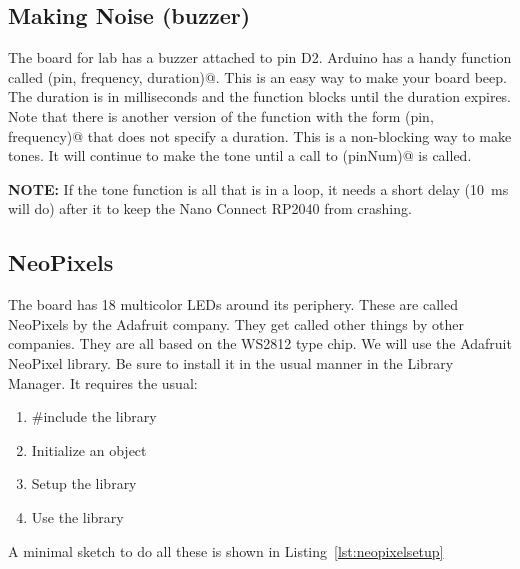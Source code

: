 \subsection{Making Noise (buzzer)}
The board for lab has a buzzer attached to pin D2. Arduino has a handy function called 
\lstinline@tone(pin, frequency, duration)@. This is an easy way to make your board beep.
The duration is in milliseconds and the function blocks until the duration expires. Note 
that there is another version of the function with the form 
\lstinline@tone(pin, frequency)@ that does not specify a duration. This is a non-blocking
way to make tones. It will continue to make the tone until a call to \lstinline@noTone(pinNum)@
is called. 

\textbf{NOTE:} If the tone function is all that is in a loop, it needs a short delay (10~ms will do)
after it to keep the Nano Connect RP2040 from crashing.

\subsection{NeoPixels}
The board has 18 multicolor LEDs around its periphery. These are called NeoPixels by the 
Adafruit company. They get called other things by other companies. They are all based on 
the WS2812 type chip. We will use the Adafruit NeoPixel library. Be sure to install it 
in the usual manner in the Library Manager. It requires the usual:
\begin{enumerate}
    \item \#include the library
    \item Initialize an object
    \item Setup the library
    \item Use the library
\end{enumerate}
A minimal sketch to do all these is shown in Listing~\ref{lst:neopixelsetup}

